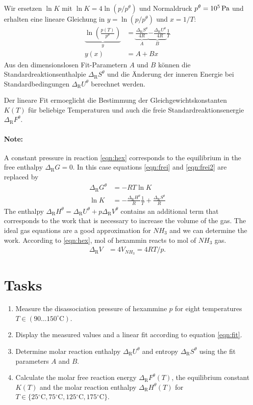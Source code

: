 \documentclass[english,twocolumn,DIV21,a4,10pt]{scrartcl}
\newcommand{\dr}{\Delta_\textrm{R}}
\newcommand{\dc}{{}^\circ\textrm{C}}
\begin{document}
Wir ersetzen $\ln K$ mit $\ln K=4\ln(p/p^\theta)$ und Normaldruck
$p^\theta = \unit[10^5]{Pa}$ und erhalten eine lineare Gleichung in $y
= \ln(p/p^\theta)$ und $x=1/T$:
\begin{align}
  \label{eqn:fit}
  \underbrace{\ln \left(\frac{p(T)}{p^\theta}\right)}_y &= 
  \underbrace{\frac{\dr S^\theta}{4R}}_A \underbrace{-\frac{\dr U^\theta}{4R}}_B
  \frac{1}{T} \\
  y(x) &= A+B x
\end{align}
Aus den dimensionslosen Fit-Parametern $A$ und $B$ können die
Standardreaktionsenthalpie $\dr S^\theta$ und die \"Anderung der
inneren Energie bei Standardbedingungen $\dr U^\theta$ berechnet
werden.

Der lineare Fit ermoeglicht die Bestimmung der
Gleichgewichtskonstanten $K(T)$ f\"ur beliebige Temperaturen und auch
die freie Standardreaktionsenergie $\dr F^\theta$.

\paragraph{Note:}
A constant pressure in reaction \ref{eqn:hex} corresponds to the
equilibrium in the free enthalpy $\dr G=0$. In this case equations
\eqref{eqn:frei} and \eqref{eqn:frei2} are replaced by
\begin{align}
  \dr G^\theta &= -RT \ln K \\
  \ln K &= - \frac{\dr H^\theta}{R} \frac{1}{T} + \frac{\dr S^\theta}{R}
\end{align}
The enthalpy $\dr H^\theta=\dr U^\theta + p \dr V^\theta$ contains an
additional term that corresponds to the work that is necessary to
increase the volume of the gas. The ideal gas equations are a good
approximation for $NH_3$ and we can determine the work. According to
\eqref{eqn:hex}, \unit[1]{mol} of hexammin reacts to \unit[4]{mol} of
$NH_3$ gas.
\begin{align}
  \dr V&= 4V_{NH_3}=4RT/p.
\end{align}
\section{Tasks}
\begin{enumerate}
\item Measure the disassociation pressure of hexammine $p$ for eight
  temperatures $T\in (90\ldots150^\circ\textrm{C})$.
\item Display the measured values and a linear fit according to
  equation \eqref{eqn:fit}.
\item Determine molar reaction enthalpy $\dr U^\theta$ and entropy
  $\dr S^\theta$ using the fit parameters $A$ and $B$.
\item Calculate the molar free reaction energy $\dr F^\theta(T)$, the
  equilibrium constant $K(T)$ and the molar reaction enthalpy $\dr
  H^\theta(T)$ for $T\in\{25\dc,75\dc,125\dc,175\dc\}$.
\end{enumerate}
\end{document}
